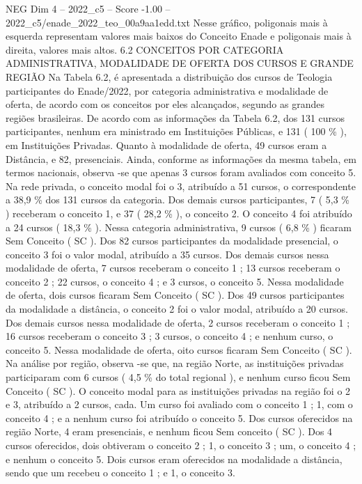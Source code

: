 \begin{textsample}{NEG Dim 4 – 2022\_c5 – Score -1.00 – 2022\_c5/enade\_2022\_teo\_00a9aa1edd.txt}
Nesse gráfico, poligonais mais à esquerda representam valores mais baixos do Conceito Enade e poligonais mais à direita, valores mais altos. 6.2 CONCEITOS POR CATEGORIA ADMINISTRATIVA, MODALIDADE DE OFERTA DOS CURSOS E GRANDE REGIÃO Na Tabela 6.2, é apresentada a distribuição dos cursos de Teologia participantes do Enade/2022, por categoria administrativa e modalidade de oferta, de acordo com os conceitos por eles alcançados, segundo as grandes regiões brasileiras.
De acordo com as informações da Tabela 6.2, dos 131 cursos participantes, nenhum era ministrado em Instituições Públicas, e 131 ( 100 \% ), em Instituições Privadas.
Quanto à modalidade de oferta, 49 cursos eram a Distância, e 82, presenciais.
Ainda, conforme as informações da mesma tabela, em termos nacionais, observa -se que apenas 3 cursos foram avaliados com conceito 5.
Na rede privada, o conceito modal foi o 3, atribuído a 51 cursos, o correspondente a 38,9 \% dos 131 cursos da categoria.
Dos demais cursos participantes, 7 ( 5,3 \% ) receberam o conceito 1, e 37 ( 28,2 \% ), o conceito 2.
O conceito 4 foi atribuído a 24 cursos ( 18,3 \% ).
Nessa categoria administrativa, 9 cursos ( 6,8 \% ) ficaram Sem Conceito ( SC ).
Dos 82 cursos participantes da modalidade presencial, o conceito 3 foi o valor modal, atribuído a 35 cursos.
Dos demais cursos nessa modalidade de oferta, 7 cursos receberam o conceito 1 ; 13 cursos receberam o conceito 2 ; 22 cursos, o conceito 4 ; e 3 cursos, o conceito 5.
Nessa modalidade de oferta, dois cursos ficaram Sem Conceito ( SC ).
Dos 49 cursos participantes da modalidade a distância, o conceito 2 foi o valor modal, atribuído a 20 cursos.
Dos demais cursos nessa modalidade de oferta, 2 cursos receberam o conceito 1 ; 16 cursos receberam o conceito 3 ; 3 cursos, o conceito 4 ; e nenhum curso, o conceito 5.
Nessa modalidade de oferta, oito cursos ficaram Sem Conceito ( SC ).
Na análise por região, observa -se que, na região Norte, as instituições privadas participaram com 6 cursos ( 4,5 \% do total regional ), e nenhum curso ficou Sem Conceito ( SC ).
O conceito modal para as instituições privadas na região foi o 2 e 3, atribuído a 2 cursos, cada.
Um curso foi avaliado com o conceito 1 ; 1, com o conceito 4 ; e a nenhum curso foi atribuído o conceito 5.
Dos cursos oferecidos na região Norte, 4 eram presenciais, e nenhum ficou Sem conceito ( SC ).
Dos 4 cursos oferecidos, dois obtiveram o conceito 2 ; 1, o conceito 3 ; um, o conceito 4 ; e nenhum o conceito 5.
Dois cursos eram oferecidos na modalidade a distância, sendo que um recebeu o conceito 1 ; e 1, o conceito 3.

\end{textsample}
